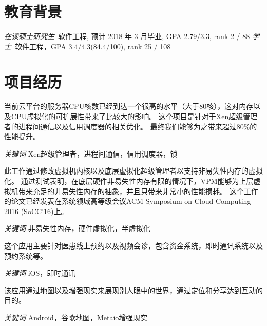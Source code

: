 \documentclass{resume}
\begin{document}


 
\section{教育背景}
\textit{在读硕士研究生}\ 软件工程, 预计 2018 年 3 月毕业, GPA 2.79/3.3, rank 2 / 88
\textit{学士}\ 软件工程，GPA 3.4/4.3(84.4/100), rank 25 / 108

\section{项目经历}
当前云平台的服务器CPU核数已经到达一个很高的水平（大于80核），这对内存以及CPU虚拟化的可扩展性带来了比较大的影响。
这个项目是针对于Xen超级管理者的进程间通信以及信用调度器的相关优化。
最终我们能够为之带来超过80\%的性能提升。

\textit{关键词} Xen超级管理者，进程间通信，信用调度器，锁

此工作通过修改虚拟机内核以及底层虚拟化超级管理者以支持非易失性内存的虚拟化。
通过测试表明，在底层硬件非易失性内存有限的情况下，VPM能够为上层虚拟机带来充足的非易失性内存的抽象，并且只带来非常小的性能损耗。
这个工作的论文已经发表在系统领域高等级会议ACM Symposium on Cloud Computing 2016 (SoCC'16)上。

\textit{关键词} 非易失性内存，硬件虚拟化，半虚拟化


这个应用主要针对医患线上预约以及视频会诊，包含资金系统，即时通讯系统以及预约系统等。

\textit{关键词} iOS，即时通讯

该应用通过地图以及增强现实来展现别人眼中的世界，通过定位和分享达到互动的目的。

\textit{关键词} Android，谷歌地图，Metaio增强现实


\end{document}
